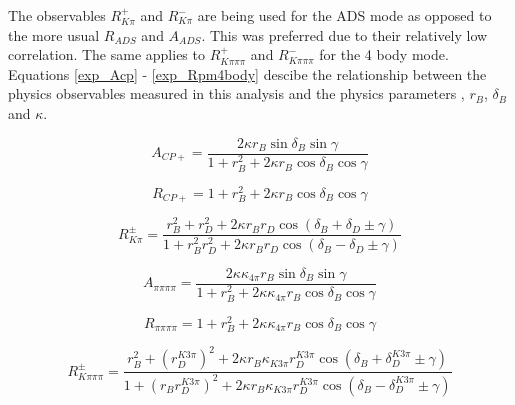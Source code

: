 The observables $R^+_{K\pi}$ and $R^-_{K\pi}$ are being used for the ADS mode as opposed to the more usual $R_{ADS}$ and $A_{ADS}$. This was preferred due to their relatively low correlation. The same applies to $R^+_{K\pi\pi\pi}$ and $R^-_{K\pi\pi\pi}$ for the 4 body mode. Equations \ref{exp_Acp} - \ref{exp_Rpm4body} descibe the relationship between the physics observables measured in this analysis and the physics parameters \Pgamma, $r_B$, $\delta_B$ and $\kappa$.

\begin{equation}
A_{CP+} = \frac{2 \kappa r_B\sin\delta_B\sin\gamma}{1 + r_B^2 + 2 \kappa r_B\cos\delta_B\cos\gamma}
\label{exp_Acp}
\end{equation}

\begin{equation}
R_{CP+} = 1 + r_B^2 + 2 \kappa r_B\cos\delta_B\cos\gamma
\label{exp_Rcp}
\end{equation}

\begin{equation}
R^{\pm}_{K\pi} = \frac{r_B^2 + r_D^2 + 2\kappa r_B r_D \cos(\delta_B + \delta_D \pm \gamma)}{1 + r_B^2r_D^2 + 2\kappa r_B r_D \cos(\delta_B - \delta_D \pm \gamma)}
\label{exp_Rpm}
\end{equation}

\begin{equation}
A_{\pi\pi\pi\pi} = \frac{2 \kappa\kappa_{4\pi} r_B\sin\delta_B\sin\gamma}{1 + r_B^2 + 2 \kappa\kappa_{4\pi} r_B\cos\delta_B\cos\gamma}
\label{exp_A4pi}
\end{equation}

\begin{equation}
R_{\pi\pi\pi\pi} = 1 + r_B^2 + 2 \kappa\kappa_{4\pi} r_B\cos\delta_B\cos\gamma
\label{exp_R4pi}
\end{equation}

\begin{equation}
R^{\pm}_{K\pi\pi\pi} = \frac{r_B^2 + \left(r_D^{K3\pi}\right)^2 + 2\kappa r_B \kappa_{K3\pi} r_D^{K3\pi} \cos(\delta_B + \delta_D^{K3\pi} \pm \gamma)}{1 + \left(r_Br_D^{K3\pi}\right)^2 + 2\kappa r_B \kappa_{K3\pi} r_D^{K3\pi} \cos(\delta_B - \delta_D^{K3\pi} \pm \gamma)}
\label{exp_Rpm4body}
\end{equation}


